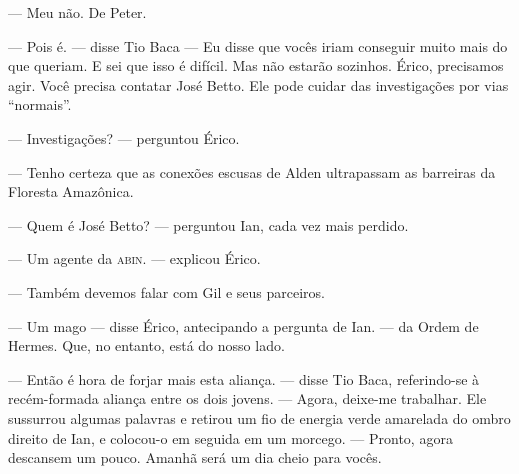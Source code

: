 --- Meu não. De Peter.

--- Pois é. --- disse Tio Baca --- Eu disse que vocês iriam conseguir muito
mais do que queriam. E sei que isso é difícil. Mas não estarão sozinhos. Érico,
precisamos agir. Você precisa contatar José Betto. Ele pode cuidar das
investigações por vias “normais”.

--- Investigações? --- perguntou Érico.

--- Tenho certeza que as conexões escusas de Alden ultrapassam as barreiras da
Floresta Amazônica.

--- Quem é José Betto? --- perguntou Ian, cada vez mais perdido.

--- Um agente da \textsc{abin}. --- explicou Érico.

--- Também devemos falar com Gil e seus parceiros.

--- Um mago --- disse Érico, antecipando a pergunta de Ian. --- da Ordem de
Hermes. Que, no entanto, está do nosso lado.

--- Então é hora de forjar mais esta aliança. --- disse Tio Baca, referindo-se
à recém-formada aliança entre os dois jovens. --- Agora, deixe-me trabalhar.
Ele sussurrou algumas palavras e retirou um fio de energia verde amarelada do
ombro direito de Ian, e colocou-o em seguida em um morcego. --- Pronto, agora
descansem um pouco. Amanhã será um dia cheio para vocês.
